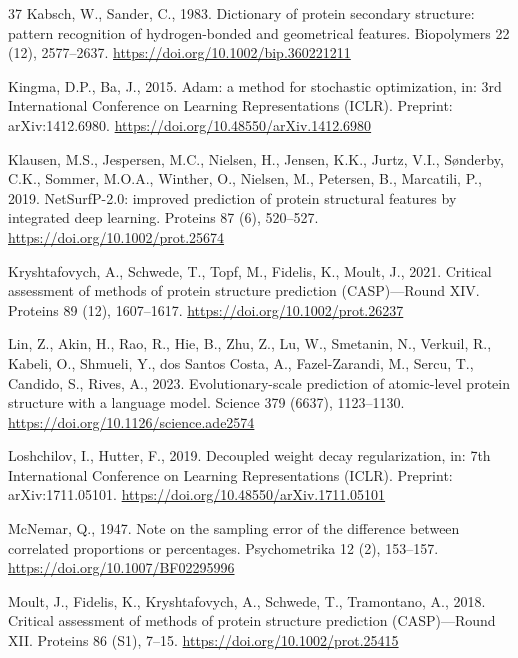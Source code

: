 \documentclass[preprint,12pt,authoryear]{elsarticle}
\begin{document}
\begin{thebibliography}{37}
Kabsch, W., Sander, C., 1983. Dictionary of protein secondary structure: pattern recognition of hydrogen-bonded and geometrical features. Biopolymers 22 (12), 2577--2637. \url{https://doi.org/10.1002/bip.360221211}

Kingma, D.P., Ba, J., 2015. Adam: a method for stochastic optimization, in: 3rd International Conference on Learning Representations (ICLR). Preprint: arXiv:1412.6980. \url{https://doi.org/10.48550/arXiv.1412.6980}

Klausen, M.S., Jespersen, M.C., Nielsen, H., Jensen, K.K., Jurtz, V.I., S{\o}nderby, C.K., Sommer, M.O.A., Winther, O., Nielsen, M., Petersen, B., Marcatili, P., 2019. NetSurfP-2.0: improved prediction of protein structural features by integrated deep learning. Proteins 87 (6), 520--527. \url{https://doi.org/10.1002/prot.25674}

Kryshtafovych, A., Schwede, T., Topf, M., Fidelis, K., Moult, J., 2021. Critical assessment of methods of protein structure prediction (CASP)---Round XIV. Proteins 89 (12), 1607--1617. \url{https://doi.org/10.1002/prot.26237}

Lin, Z., Akin, H., Rao, R., Hie, B., Zhu, Z., Lu, W., Smetanin, N., Verkuil, R., Kabeli, O., Shmueli, Y., dos Santos Costa, A., Fazel-Zarandi, M., Sercu, T., Candido, S., Rives, A., 2023. Evolutionary-scale prediction of atomic-level protein structure with a language model. Science 379 (6637), 1123--1130. \url{https://doi.org/10.1126/science.ade2574}

Loshchilov, I., Hutter, F., 2019. Decoupled weight decay regularization, in: 7th International Conference on Learning Representations (ICLR). Preprint: arXiv:1711.05101. \url{https://doi.org/10.48550/arXiv.1711.05101}

McNemar, Q., 1947. Note on the sampling error of the difference between correlated proportions or percentages. Psychometrika 12 (2), 153--157. \url{https://doi.org/10.1007/BF02295996}

Moult, J., Fidelis, K., Kryshtafovych, A., Schwede, T., Tramontano, A., 2018. Critical assessment of methods of protein structure prediction (CASP)---Round XII. Proteins 86 (S1), 7--15. \url{https://doi.org/10.1002/prot.25415}


\end{thebibliography}
\end{document}
